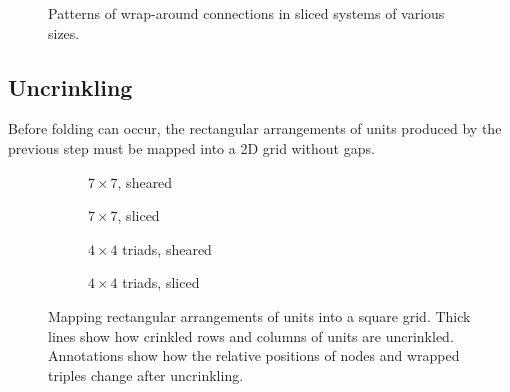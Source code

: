 			\begin{figure}
				\center
				\caption{Patterns of wrap-around connections in sliced systems of
				various sizes.}
				\label{fig:slicing-examples}
			\end{figure}
			
		\subsection{Uncrinkling}
			
			Before folding can occur, the rectangular arrangements of units produced
			by the previous step must be mapped into a 2D grid without gaps.
			
			\begin{figure}
				\center
				\begin{subfigure}[b]{0.44\linewidth}
					\center
					
					\caption{$7 \times 7$, sheared}
					\label{fig:uncrinkling-node-sheared}
				\end{subfigure}
				\begin{subfigure}[b]{0.44\linewidth}
					\center
					
					\caption{$7 \times 7$, sliced}
					\label{fig:uncrinkling-node-sliced}
				\end{subfigure}
				
				\vspace{1cm}
				
				\begin{subfigure}[b]{0.44\linewidth}
					\center
					
					\caption{$4 \times 4$ triads, sheared}
					\label{fig:uncrinkling-sheared}
				\end{subfigure}
				\begin{subfigure}[b]{0.44\linewidth}
					\center
					
					\caption{$4 \times 4$ triads, sliced}
					\label{fig:uncrinkling-sliced}
				\end{subfigure}
				
				\vspace{1em}
				
				\caption{Mapping rectangular arrangements of units into a square grid.
				Thick lines show how crinkled rows and columns of units are uncrinkled.
				Annotations show how the relative positions of nodes and wrapped
				triples change after uncrinkling.}
				\label{fig:uncrinkling}
			\end{figure}
			
